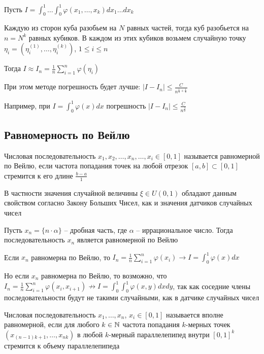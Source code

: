 \documentclass[12pt]{article}
\begin{document}
\hypertarget{monte_carlo_2}{}

Пусть $I = \int_0^1 \dots \int_0^1 \varphi(x_1, \dots, x_k) dx_1 \dots dx_k$

Каждую из сторон куба разобьем на $N$ равных частей, тогда куб разобьется на $n = N^k$ равных кубиков. В каждом из этих кубиков возьмем случайную точку $\eta_i = (\eta_i^{(1)}, \dots, \eta_i^{(k)})$, $1 \leq i \leq n$

Тогда $I \approx I_n = \frac{1}{n} \sum_{i = 1}^n \varphi(\eta_i)$

При этом методе погрешность будет лучше: $|I - I_n| \leq \frac{C}{n^{\frac{1}{2} + \frac{1}{k}}}$

Например, при $I = \int_0^1 \varphi(x) dx$ погрешность $|I - I_n| \leq \frac{C}{n^\frac{3}{2}}$

\subsection{Равномерность по Вейлю}

\Def Числовая последовательность $x_1, x_2, \dots, x_n, \dots, x_i \in [0, 1]$ называется равномерной по Вейлю, если частота попадания точек на любой отрезок $[a, b] \subset [0, 1]$ стремится к его длине $\frac{b - a}{1}$

В частности значения случайной величины $\xi \in U(0, 1)$ обладают данным свойством согласно Закону Больших Чисел, как и значения датчиков случайных чисел 

\begin{MyTheorem}
    \Ths Пусть $x_n = \{n \cdot \alpha\}$ -- дробная часть, где $\alpha$ -- иррациональное число. Тогда последовательность $x_n$ является равномерной по Вейлю
\end{MyTheorem}

Если $x_n$ равномерна по Вейлю, то $I_n = \frac{1}{n} \sum_{i = 1}^n \varphi(x_i) \longrightarrow I = \int_0^1 \varphi(x) dx$

\Nota Но если $x_n$ равномерна по Вейлю, то возможно, что $I_n = \frac{1}{n} \sum_{i = 1}^n \varphi(x_i, x_{i + 1}) \not\longrightarrow I = \int_0^1 \int_0^1 \varphi(x, y) dx dy$, так как соседние члены последовательности будут не такими случайными, как в датчике случайных чисел 

\Def Числовая последовательность $x_1, \dots, x_n$, $x_i \in [0, 1]$ называется вполне равномерной, если для любого $k \in \mathbb{N}$ частота попадания $k$-мерных точек $(x_{(n - 1) k + 1}, \dots, x_{nk})$ в любой $k$-мерный параллелепипед внутри $[0, 1]^k$ стремится к объему параллелепипеда
\end{document}
